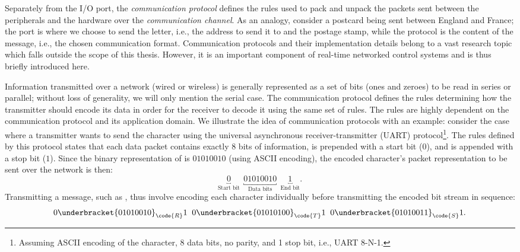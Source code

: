 Separately from the I/O port, the \emph{communication protocol} defines the rules used to pack and unpack the packets sent between the peripherals and the hardware over the \emph{communication channel}.
As an analogy, consider a postcard being sent between England and France; the port is where we choose to send the letter, i.e., the address to send it to and the postage stamp, while the protocol is the content of the message, i.e., the chosen communication format.
Communication protocols and their implementation details belong to a vast research topic which falls outside the scope of this thesis.
However, it is an important component of real-time networked control systems and is thus briefly introduced here.

Information transmitted over a network (wired or wireless) is generally represented as a set of bits (ones and zeroes) to be read in series or parallel; without loss of generality, we will only mention the serial case.
The communication protocol defines the rules determining how the transmitter should encode its data in order for the receiver to decode it using the same set of rules.
The rules are highly dependent on the communication protocol and its application domain.
We illustrate the idea of communication protocols with an example: consider the case where a transmitter wants to send the character  using the universal asynchronous receiver-transmitter (UART) protocol\footnote{Assuming ASCII encoding of the character, 8 data bits, no parity, and 1 stop bit, i.e., UART 8-N-1.}.
The rules defined by this protocol states that each data packet contains exactly 8 bits of information, is prepended with a start bit ($0$), and is appended with a stop bit ($1$).
Since the binary representation of  is $01010010$ (using ASCII encoding), the encoded character's packet representation to be sent over the network is then:
%
\begin{equation*}
    \underbracket{0}_{\text{Start bit}} \;\, \underbracket{01010010}_{\text{Data bits}} \;\, \underbracket{1}_{\text{End bit}}.
\end{equation*}
%
Transmitting a message, such as , thus involve encoding each character individually before transmitting the encoded bit stream in sequence:
%
\begin{equation*}
    0\underbracket{01010010}_{\code{R}}1 \;\;
    0\underbracket{01010100}_{\code{T}}1 \;\;
    0\underbracket{01010011}_{\code{S}}1.
\end{equation*}

